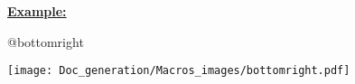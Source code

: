 \documentclass{article}
\begin{document}
\textbf{\underline{Example:}}

\begin{minipage}{0.45\linewidth}
\raggedright
\begin{spverbatim}
@bottomright 
\end{spverbatim}
\end{minipage}
\begin{minipage}{0.45\linewidth}
\raggedleft
\texttt{[image: Doc\_generation/Macros\_images/bottomright.pdf]}
\end{minipage} 
\end{document}
